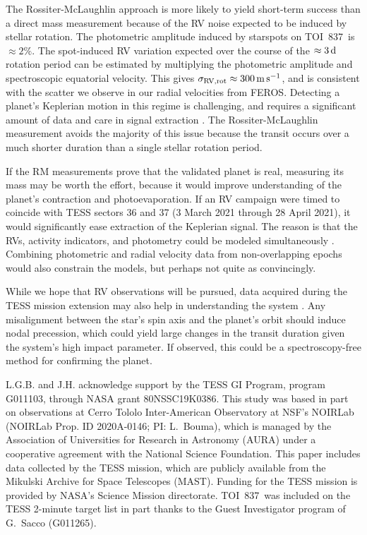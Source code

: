 \documentclass[12pt,twocolumn,tighten]{aastex63}
\newcommand{\tn}{TOI~837} %
\begin{document}
The Rossiter-McLaughlin approach is more likely to yield short-term
success than a direct mass measurement because of the RV noise
expected to be induced by stellar rotation.  The photometric amplitude
induced by starspots on \tn\ is $\approx 2\%$.  The spot-induced RV
variation expected over the course of the $\approx 3\,{\rm d}$
rotation period can be estimated by multiplying the photometric
amplitude and spectroscopic equatorial velocity.  This gives
$\sigma_{\rm RV,rot} \approx 300\,{\rm m\,s}^{-1}$, and is consistent
with the scatter we observe in our radial velocities from FEROS.
Detecting a planet's Keplerian motion in this regime is challenging,
and requires a significant amount of data and care in signal
extraction \citep{barragan_radial_2019}.  The Rossiter-McLaughlin
measurement avoids the majority of this issue because the transit
occurs over a much shorter duration than a single stellar rotation
period.  

If the RM measurements prove that the validated planet is real,
measuring its mass may be worth the effort, because it would improve
understanding of the planet's contraction and photoevaporation.  If an
RV campaign were timed to coincide with TESS sectors 36 and 37 (3
March 2021 through 28 April 2021), it would significantly ease
extraction of the Keplerian signal.  The reason is that the RVs,
activity indicators, and photometry could be modeled simultaneously
\citep[{\it e.g.},][]{aigrain_simple_2012,rajpaul_gaussian_2015}.
Combining photometric and radial velocity data from non-overlapping
epochs would also constrain the models, but perhaps not quite as
convincingly.

While we hope that RV observations will be pursued, data acquired
during the TESS mission extension may also help in understanding the
system \citep{bouma_extend_2017,huang_expected_2018}.  Any
misalignment between the star's spin axis and the planet's orbit
should induce nodal precession, which could yield large changes in the
transit duration given the system's high impact parameter.  If
observed, this could be a spectroscopy-free method for confirming the
planet.





\acknowledgements
\raggedbottom

L.G.B. and J.H. acknowledge support by the TESS GI Program, program
G011103, through NASA grant 80NSSC19K0386.
%
This study was based in part on observations at Cerro Tololo
Inter-American Observatory at NSF’s NOIRLab (NOIRLab Prop. ID
2020A-0146; PI: L{.}~Bouma), which is managed by the Association of
Universities for Research in Astronomy (AURA) under a cooperative
agreement with the National Science Foundation.
%
This paper includes data collected by the TESS mission, which are
publicly available from the Mikulski Archive for Space Telescopes
(MAST).
%
Funding for the TESS mission is provided by NASA's Science Mission
directorate.  \tn\ was included on the TESS 2-minute target list in
part thanks to the Guest Investigator program of G.\ Sacco (G011265).
%
\end{document}

